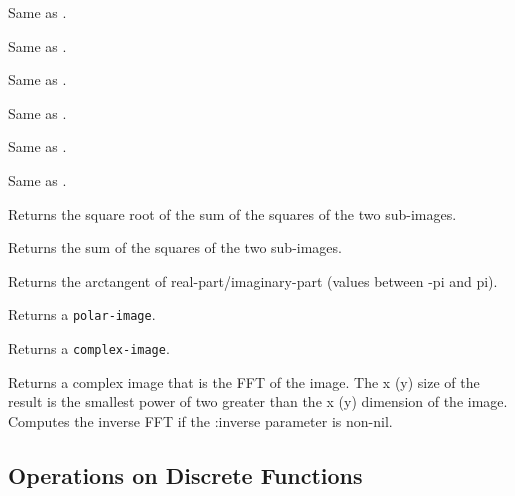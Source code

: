 \begin{description}
\item{}
Same as .

\item{}
Same as .

\item{}
Same as .

\item{}
Same as .

\item{}
Same as .

\item{}
Same as .

\item{}

\item{}
Returns the square root of the sum of the squares of the two sub-images.

\item{}
Returns the sum of the squares of the two sub-images.

\item{}
Returns the arctangent of real-part/imaginary-part (values between -pi
and pi).

\item{}
\item{}
Returns a {\tt polar-image}.

\item{}
Returns a {\tt complex-image}.

\item{}
Returns a complex image that is the FFT of the image.  The x (y) size
of the result is the smallest power of two greater than the x (y)
dimension of the image.  Computes the inverse FFT if the :inverse
parameter is non-nil.
\end{description}


\subsection{Operations on Discrete Functions}

